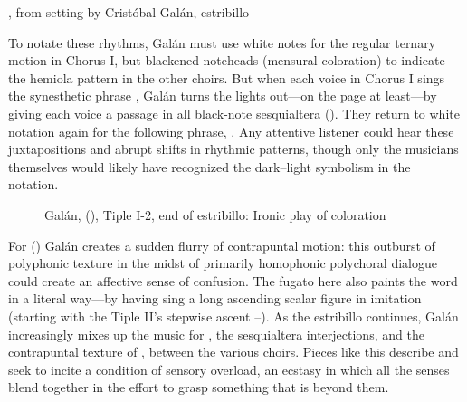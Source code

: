 
\begin{poemexample}
    \caption{, from setting by Cristóbal Galán,
    estribillo} 
    \label{poem:Oigan_todos_del_ave-Galan}
\end{poemexample}

To notate these rhythms, Galán must use white notes for the regular ternary
motion in Chorus I, but blackened noteheads (mensural coloration) to indicate
the hemiola pattern in the other choirs.
But when each voice in Chorus I sings the synesthetic phrase , Galán turns the lights out---on the page at least---by
giving each voice a passage in all black-note sesquialtera
().
They return to white notation again for the following phrase, .
Any attentive listener could hear these juxtapositions and abrupt shifts in
rhythmic patterns, though only the musicians themselves would likely have
recognized the dark--light symbolism in the notation.%
    \Autocite[36]{Kendrick:Jeremiah}


\begin{figure}
    \caption{Galán,  (),
    Tiple I-2, end of estribillo: Ironic play of coloration}
    \label{fig:Galan-Oigan-coloratio}
\end{figure}

For  () Galán creates a
sudden flurry of contrapuntal motion: this outburst of polyphonic texture in
the midst of primarily homophonic polychoral dialogue could create an affective
sense of confusion.
The fugato here also paints the word  in a literal way---by
having  sing a long ascending scalar figure in imitation
(starting with the Tiple II's stepwise ascent --).
As the estribillo continues, Galán increasingly mixes up the music for
, the sesquialtera interjections, and the contrapuntal
texture of , between the various choirs.
Pieces like this describe and seek to incite a condition of sensory overload, an
ecstasy in which all the senses blend together in the effort to grasp something
that is beyond them.

